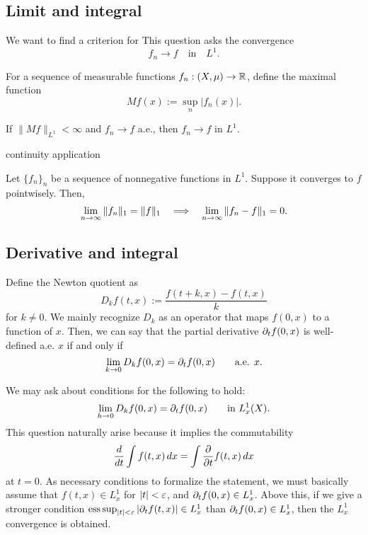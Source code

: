 \documentclass[12pt]{article}
\begin{document}
\subsection{Limit and integral}
We want to find a criterion for 
This question asks the convergence
\[f_n\to f\quad\text{in}\quad L^1.\]

For a sequence of measurable functions $f_n:(X,\mu)\to\mathbb{R}$, define the maximal function
\[Mf(x):=\sup_n|f_n(x)|.\]
\begin{thm}[LDCT]
If $\|Mf\|_{L^1}<\infty$ and $f_n\to f$ a.e., then $f_n\to f$ in $L^1$.
\end{thm}

continuity application

\begin{thm}[Scheffe]
Let $\{f_n\}_n$ be a sequence of nonnegative functions in $L^1$.
Suppose it converges to $f$ pointwisely.
Then,
\[\lim_{n\to\infty}\|f_n\|_1=\|f\|_1\impl\lim_{n\to\infty}\|f_n-f\|_1=0.\]
\end{thm}

\subsection{Derivative and integral}

Define the Newton quotient as
\[D_kf(t,x):=\frac{f(t+k,x)-f(t,x)}k\]
for $k\ne0$.
We mainly recognize $D_k$ as an operator that maps $f(0,x)$ to a function of $x$.
Then, we can say that the partial derivative $\pd_tf(0,x)$ is well-defined a.e. $x$ if and only if
\[\lim_{k\to0}D_kf(0,x)=\pd_tf(0,x)\qquad\text{a.e. }x.\]

We may ask about conditions for the following to hold:
\[\lim_{h\to0}D_kf(0,x)=\pd_tf(0,x)\qquad\text{in }L_x^1(X).\]
This question naturally arise because it implies the commutability
\[\dd{t}\int f(t,x)\,dx=\int\pd{t}f(t,x)\,dx\]
at $t=0$.
As necessary conditions to formalize the statement, we must basically assume that $f(t,x)\in L_x^1$ for $|t|<\varepsilon$, and $\pd_tf(0,x)\in L_x^1$.
Above this, if we give a stronger condition $\esssup_{|t|<\e}|\pd_tf(t,x)|\in L_x^1$ than $\pd_tf(0,x)\in L_x^1$, then the $L_x^1$ convergence is obtained.
\end{document}
